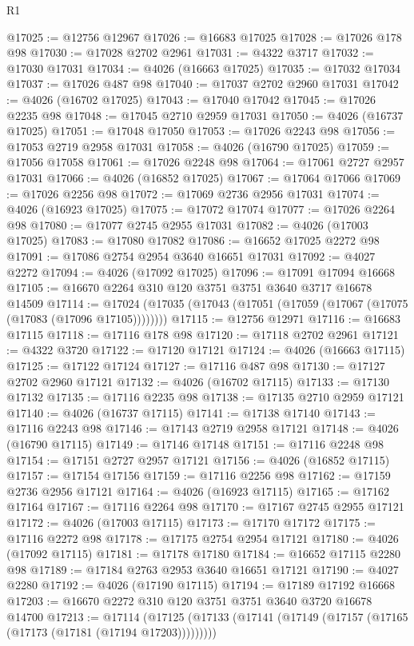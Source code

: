 \begin{lexlean}{R1}
\begin{coremodule}
@17025 := @12756 @12967
@17026 := @16683 @17025
@17028 := @17026 @178 @98
@17030 := @17028 @2702 @2961
@17031 := @4322 @3717
@17032 := @17030 @17031
@17034 := @4026 (@16663 @17025)
@17035 := @17032 @17034
@17037 := @17026 @487 @98
@17040 := @17037 @2702 @2960 @17031
@17042 := @4026 (@16702 @17025)
@17043 := @17040 @17042
@17045 := @17026 @2235 @98
@17048 := @17045 @2710 @2959 @17031
@17050 := @4026 (@16737 @17025)
@17051 := @17048 @17050
@17053 := @17026 @2243 @98
@17056 := @17053 @2719 @2958 @17031
@17058 := @4026 (@16790 @17025)
@17059 := @17056 @17058
@17061 := @17026 @2248 @98
@17064 := @17061 @2727 @2957 @17031
@17066 := @4026 (@16852 @17025)
@17067 := @17064 @17066
@17069 := @17026 @2256 @98
@17072 := @17069 @2736 @2956 @17031
@17074 := @4026 (@16923 @17025)
@17075 := @17072 @17074
@17077 := @17026 @2264 @98
@17080 := @17077 @2745 @2955 @17031
@17082 := @4026 (@17003 @17025)
@17083 := @17080 @17082
@17086 := @16652 @17025 @2272 @98
@17091 := @17086 @2754 @2954 @3640 @16651 @17031
@17092 := @4027 @2272
@17094 := @4026 (@17092 @17025)
@17096 := @17091 @17094 @16668
@17105 := @16670 @2264 @310 @120 @3751 @3751 @3640 @3717 @16678 @14509
@17114 := @17024 (@17035 (@17043 (@17051 (@17059 (@17067 (@17075 (@17083 (@17096 @17105))))))))
@17115 := @12756 @12971
@17116 := @16683 @17115
@17118 := @17116 @178 @98
@17120 := @17118 @2702 @2961
@17121 := @4322 @3720
@17122 := @17120 @17121
@17124 := @4026 (@16663 @17115)
@17125 := @17122 @17124
@17127 := @17116 @487 @98
@17130 := @17127 @2702 @2960 @17121
@17132 := @4026 (@16702 @17115)
@17133 := @17130 @17132
@17135 := @17116 @2235 @98
@17138 := @17135 @2710 @2959 @17121
@17140 := @4026 (@16737 @17115)
@17141 := @17138 @17140
@17143 := @17116 @2243 @98
@17146 := @17143 @2719 @2958 @17121
@17148 := @4026 (@16790 @17115)
@17149 := @17146 @17148
@17151 := @17116 @2248 @98
@17154 := @17151 @2727 @2957 @17121
@17156 := @4026 (@16852 @17115)
@17157 := @17154 @17156
@17159 := @17116 @2256 @98
@17162 := @17159 @2736 @2956 @17121
@17164 := @4026 (@16923 @17115)
@17165 := @17162 @17164
@17167 := @17116 @2264 @98
@17170 := @17167 @2745 @2955 @17121
@17172 := @4026 (@17003 @17115)
@17173 := @17170 @17172
@17175 := @17116 @2272 @98
@17178 := @17175 @2754 @2954 @17121
@17180 := @4026 (@17092 @17115)
@17181 := @17178 @17180
@17184 := @16652 @17115 @2280 @98
@17189 := @17184 @2763 @2953 @3640 @16651 @17121
@17190 := @4027 @2280
@17192 := @4026 (@17190 @17115)
@17194 := @17189 @17192 @16668
@17203 := @16670 @2272 @310 @120 @3751 @3751 @3640 @3720 @16678 @14700
@17213 := @17114
    (@17125 (@17133 (@17141 (@17149 (@17157 (@17165 (@17173 (@17181 (@17194 @17203)))))))))

\end{coremodule}
\end{lexlean}
